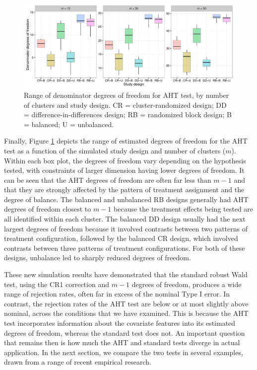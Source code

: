 \documentclass[draft]{ectaart}\usepackage[]{graphicx}\usepackage[]{color}
\newenvironment{knitrout}{}{} %
\begin{document}
\begin{knitrout}
\color{fgcolor}\begin{figure}

{\centering \includegraphics[width=\linewidth]{CR_fig/df-1} 

}

\caption[Range of denominator degrees of freedom for AHT test, by number of clusters and study design]{Range of denominator degrees of freedom for AHT test, by number of clusters and study design. CR = cluster-randomized design; DD = difference-in-differences design; RB = randomized block design; B = balanced; U = unbalanced.}\label{fig:df}
\end{figure}


\end{knitrout}

Finally, Figure \ref{fig:df} depicts the range of estimated degrees of freedom for the AHT test as a function of the simulated study design and number of clusters ($m$). 
Within each box plot, the degrees of freedom vary depending on the hypothesis tested, with constraints of larger dimension having lower degrees of freedom. 
It can be seen that the AHT degrees of freedom are often far less than $m - 1$ and that they are strongly affected by the pattern of treatment assignment and the degree of balance. The balanced and unbalanced RB designs generally had AHT degrees of freedom closest to $m - 1$ because the treatment effects being tested are all identified within each cluster. 
The balanced DD design usually had the next largest degrees of freedom because it involved contrasts between two patterns of treatment configuration, followed by the balanced CR design, which involved contrasts between three patterns of treatment configurations. 
For both of these designs, unbalance led to sharply reduced degrees of freedom.

These new simulation results have demonstrated that the standard robust Wald test, using the CR1 correction and $m - 1$ degrees of freedom, produces a wide range of rejection rates, often far in excess of the nominal Type I error. 
In contrast, the rejection rates of the AHT test are below or at most slightly above nominal, across the conditions that we have examined.
This is because the AHT test incorporates information about the covariate features into its estimated degrees of freedom, whereas the standard test does not.
An important question that remains then is how much the AHT and standard tests diverge in actual application.
In the next section, we compare the two tests in several examples, drawn from a range of recent empirical research.
\end{document}
